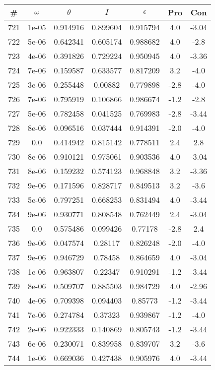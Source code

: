 \begin{table}
\begin{tabular}{c|c|c|c|c|c|c}
\# & $\omega$ & $\theta$ & $I$ & $\epsilon$ & Pro & Con\\
\hline
721 & 1e-05 & 0.914916 & 0.899604 & 0.915794 & 4.0 & -3.04\\
722 & 5e-06 & 0.642341 & 0.605174 & 0.988682 & 4.0 & -2.8\\
723 & 4e-06 & 0.391826 & 0.729224 & 0.950945 & 4.0 & -3.36\\
724 & 7e-06 & 0.159587 & 0.633577 & 0.817209 & 3.2 & -4.0\\
725 & 3e-06 & 0.255448 & 0.00882 & 0.779898 & -2.8 & -4.0\\
726 & 7e-06 & 0.795919 & 0.106866 & 0.986674 & -1.2 & -2.8\\
727 & 5e-06 & 0.782458 & 0.041525 & 0.769983 & -2.8 & -3.44\\
728 & 8e-06 & 0.096516 & 0.037444 & 0.914391 & -2.0 & -4.0\\
729 & 0.0 & 0.414942 & 0.815142 & 0.778511 & 2.4 & 2.8\\
730 & 8e-06 & 0.910121 & 0.975061 & 0.903536 & 4.0 & -3.04\\
731 & 8e-06 & 0.159232 & 0.574123 & 0.968848 & 3.2 & -3.36\\
732 & 9e-06 & 0.171596 & 0.828717 & 0.849513 & 3.2 & -3.6\\
733 & 5e-06 & 0.797251 & 0.668253 & 0.831494 & 4.0 & -3.44\\
734 & 9e-06 & 0.930771 & 0.808548 & 0.762449 & 2.4 & -3.04\\
735 & 0.0 & 0.575486 & 0.099426 & 0.77178 & -2.8 & 2.4\\
736 & 9e-06 & 0.047574 & 0.28117 & 0.826248 & -2.0 & -4.0\\
737 & 9e-06 & 0.946729 & 0.78458 & 0.864659 & 4.0 & -3.04\\
738 & 1e-06 & 0.963807 & 0.22347 & 0.910291 & -1.2 & -3.44\\
739 & 8e-06 & 0.509707 & 0.885503 & 0.984729 & 4.0 & -2.96\\
740 & 4e-06 & 0.709398 & 0.094403 & 0.85773 & -1.2 & -3.44\\
741 & 7e-06 & 0.274784 & 0.37323 & 0.939867 & -1.2 & -4.0\\
742 & 2e-06 & 0.922333 & 0.140869 & 0.805743 & -1.2 & -3.44\\
743 & 6e-06 & 0.230071 & 0.839958 & 0.839707 & 3.2 & -3.6\\
744 & 1e-06 & 0.669036 & 0.427438 & 0.905976 & 4.0 & -3.44\\

\end{tabular}
\end{table}
